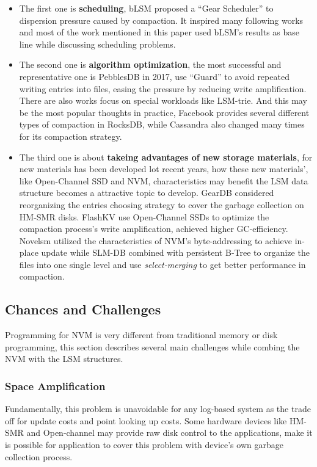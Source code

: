 \begin{itemize}
	\item The first one is \textbf{scheduling},  bLSM\cite{sears2012blsm} proposed a ``Gear Scheduler'' to dispersion pressure caused by compaction. It inspired many following works and most of the work mentioned in this paper used bLSM's results as base line while discussing scheduling problems. 
	\item 
	The second one is \textbf{algorithm optimization}, the most successful and representative one is PebblesDB in 2017\cite{raju2017pebblesdb}, use ``Guard'' to avoid repeated writing entries into files, easing the pressure by reducing write amplification. There are also works focus on special workloads like LSM-trie\cite{wu2015lsm}. And this may be the most popular thoughts in practice, Facebook provides several different types of compaction in RocksDB\cite{Compacti60:online},\cite{dong2017optimizing} while Cassandra also changed many times for its compaction strategy\cite{Document20:online}.  
	\item The third one is about \textbf{takeing advantages of new storage materials}, for new materials has been developed lot recent years, how these new materials', like Open-Channel SSD\cite{bjorling2017lightnvm} and NVM, characteristics may benefit the LSM data structure becomes a attractive topic to develop. GearDB\cite{yao2019geardb} considered reorganizing the entries choosing strategy to cover the garbage collection on HM-SMR disks. FlashKV\cite{zhang2017flashkv} use Open-Channel SSDs to optimize the compaction process's write amplification, achieved higher GC-efficiency. Novelsm\cite{kannan2018redesigning} utilized the characteristics of NVM's byte-addressing to achieve in-place update while SLM-DB\cite{kaiyrakhmet2019slm} combined with persistent B-Tree to organize the files into one single level and use \textit{select-merging} to get better performance in compaction.
	
\end{itemize}

\subsection{Chances and Challenges}
Programming for NVM is very different from traditional memory or disk programming, this section describes several main challenges while combing the NVM with the LSM structures.

\subsubsection{Space Amplification}
Fundamentally, this problem is unavoidable for any log-based system as the trade off for update costs and point looking up costs. Some hardware devices like HM-SMR and Open-channel may provide raw disk control to the applications, make it is possible for application to cover this problem with device's own garbage collection process\cite{zhang2017flashkv}.

